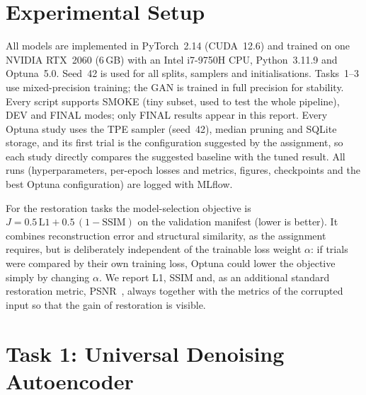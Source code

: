 \documentclass[conference]{IEEEtran}
\begin{document}
\section{Experimental Setup}
All models are implemented in PyTorch~2.14 (CUDA~12.6) and trained on one NVIDIA RTX~2060 (6\,GB) with an
Intel i7-9750H CPU, Python~3.11.9 and Optuna~5.0. Seed~42 is used for all splits, samplers and
initialisations. Tasks~1--3 use mixed-precision training; the GAN is trained in full precision for
stability. Every script supports SMOKE (tiny subset, used to test the whole pipeline), DEV and FINAL modes;
only FINAL results appear in this report. Every Optuna study uses the TPE sampler (seed~42), median pruning
and SQLite storage, and its first trial is the configuration suggested by the assignment, so each study
directly compares the suggested baseline with the tuned result. All runs (hyperparameters, per-epoch losses
and metrics, figures, checkpoints and the best Optuna configuration) are logged with MLflow.

For the restoration tasks the model-selection objective is
$J=0.5\,\mathrm{L1}+0.5\,(1-\mathrm{SSIM})$ on the validation manifest (lower is better). It combines
reconstruction error and structural similarity, as the assignment requires, but is deliberately independent
of the trainable loss weight $\alpha$: if trials were compared by their own training loss, Optuna could
lower the objective simply by changing $\alpha$. We report L1, SSIM and, as an additional standard
restoration metric, PSNR~\cite{hore2010psnr}, always together with the metrics of the corrupted input so
that the gain of restoration is visible.

\FloatBarrier
\section{Task 1: Universal Denoising Autoencoder}
\end{document}
